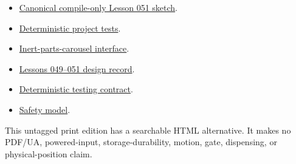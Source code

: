 \documentclass[10pt]{article}
\begin{document}
\begin{itemize}
 \item \href{https://github.com/spincyc/adk/blob/main/examples/Lesson051InertPartsCarousel/Lesson051InertPartsCarousel.ino}
       {Canonical compile-only Lesson 051 sketch}.
 \item \href{https://github.com/spincyc/adk/blob/main/tests/test_inert_parts_carousel.cpp}
       {Deterministic project tests}.
 \item \href{https://github.com/spincyc/adk/blob/main/src/inert_parts_carousel.h}
       {Inert-parts-carousel interface}.
 \item \href{https://github.com/spincyc/adk/blob/main/docs/design/LESSONS_049_051_PARTS_CAROUSEL_PLAN.md}
       {Lessons 049--051 design record}.
 \item \href{https://github.com/spincyc/adk/blob/main/docs/TESTING.md}
       {Deterministic testing contract}.
 \item \href{https://github.com/spincyc/adk/blob/main/docs/SAFETY_MODEL.md}
       {Safety model}.
\end{itemize}

This untagged print edition has a searchable HTML alternative.
It makes no PDF/UA, powered-input, storage-durability, motion, gate, dispensing,
or physical-position claim.
\end{document}
